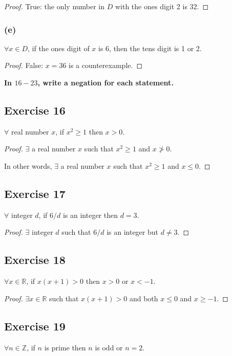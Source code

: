 \documentclass[14pt]{extarticle}
\newcommand{\R}{\mathbb{R}}
\newcommand{\Z}{\mathbb{Z}}
\newcommand{\fa}{\forall}
\newcommand{\te}{\exists}
\begin{document}
\begin{proof}
True: the only number in $D$ with the ones digit 2 is 32.
\end{proof}

\subsubsection{(e)}
$\fa x \in D$, if the ones digit of $x$ is 6, then the tens digit is 1 or 2.

\begin{proof}
False: $x = 36$ is a counterexample.
\end{proof}

{\bf \color{cyan} In $16-23$, write a negation for each statement.}

\subsection{Exercise 16}
$\fa$ real number $x$, if $x^2 \geq 1$ then $x > 0$.

\begin{proof}
$\te$ a real number $x$ such that $x^2 \geq 1$ and $x \ngtr 0$. 

In other words, $\te$ a real number $x$ such that $x^2 \geq 1$ and $x \leq 0$.
\end{proof}

\subsection{Exercise 17}
$\fa$ integer $d$, if $6 / d$ is an integer then $d = 3$.

\begin{proof}
$\te$ integer $d$ such that $6 / d$ is an integer but $d \neq 3$.
\end{proof}

\subsection{Exercise 18}
$\fa x \in \R$, if $x(x + 1) > 0$ then $x > 0$ or $x < -1$.

\begin{proof}
$\te x \in \R$ such that $x(x + 1) > 0$ and both $x \leq 0$ and $x \geq -1$.
\end{proof}

\subsection{Exercise 19}
$\fa n \in \Z$, if $n$ is prime then $n$ is odd or $n = 2$.
\end{document}
